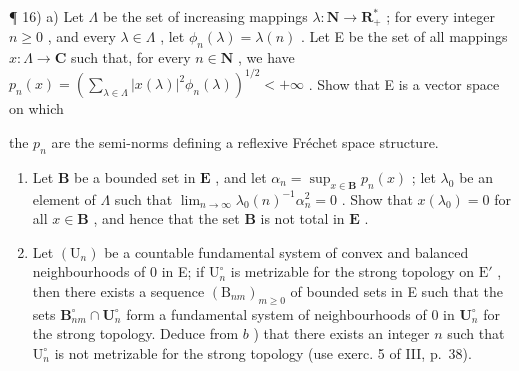 ¶ 16) a) Let \(\Lambda\) be the set of increasing mappings \(\lambda : \mathbf{N} \to \mathbf{R}_{+}^{*}\) ; for every integer \(n \geqslant 0\) , and every \(\lambda \in \Lambda\) , let \(\phi_{n}(\lambda) = \lambda(n)\) . Let E be the set of all mappings \(x: \Lambda \to \mathbf{C}\) such that, for every \(n \in \mathbf{N}\) , we have \(p_{n}(x) = \left( \sum_{\lambda \in \Lambda} |x(\lambda)|^{2} \phi_{n}(\lambda) \right)^{1/2} < +\infty\) . Show that E is a vector space on which

the \(p_{n}\) are the semi-norms defining a reflexive Fréchet space structure.

\begin{enumerate}
\def\labelenumi{\alph{enumi})}
\setcounter{enumi}{1}
\item
  Let \(\mathbf{B}\) be a bounded set in \(\mathbf{E}\) , and let \(\alpha_{n} = \sup_{x\in \mathbf{B}}p_{n}(x)\) ; let \(\lambda_0\) be an element of \(\Lambda\) such that \(\lim_{n\to \infty}\lambda_0(n)^{-1}\alpha_n^2 = 0\) . Show that \(x(\lambda_0) = 0\) for all \(x\in \mathbf{B}\) , and hence that the set \(\mathbf{B}\) is not total in \(\mathbf{E}\) .
\item
  Let \((\mathrm{U}_n)\) be a countable fundamental system of convex and balanced neighbourhoods of 0 in E; if \(\mathrm{U}_n^\circ\) is metrizable for the strong topology on \(\mathrm{E}'\) , then there exists a sequence \((\mathrm{B}_{nm})_{m\geqslant 0}\) of bounded sets in E such that the sets \(\mathbf{B}_{nm}^{\circ}\cap \mathbf{U}_n^\circ\) form a fundamental system of neighbourhoods of 0 in \(\mathbf{U}_n^\circ\) for the strong topology. Deduce from \(b\) ) that there exists an integer \(n\) such that \(\mathrm{U}_n^\circ\) is not metrizable for the strong topology (use exerc. 5 of III, p.~38).
\end{enumerate}

\exercisegroup

